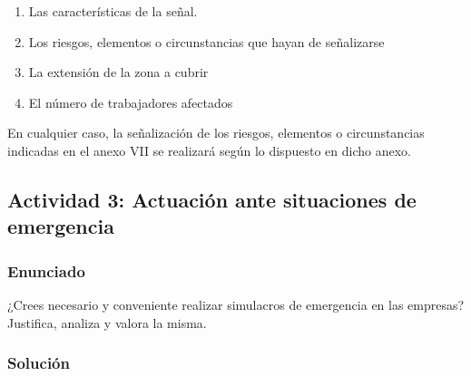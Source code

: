 \begin{enumerate}[label=\alph*.]
    \begin{enumerate}[label=\alph*.]
        \item Las características de la señal.
        \item Los riesgos, elementos o circunstancias que hayan de señalizarse
        \item La extensión de la zona a cubrir
        \item El número de trabajadores afectados
    \end{enumerate}

    En cualquier caso, la señalización de los riesgos, elementos o circunstancias indicadas en el anexo VII se realizará según lo dispuesto en dicho anexo.
\end{enumerate}

\subsection{Actividad 3: Actuación ante situaciones de emergencia}

\subsubsection{Enunciado}
¿Crees necesario y conveniente realizar simulacros de emergencia en las empresas? Justifica, analiza y valora la misma.

\subsubsection{Solución}


\newpage



